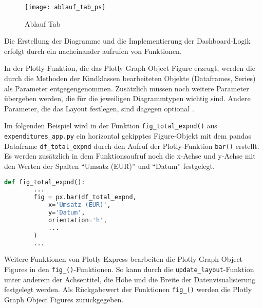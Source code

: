     \begin{figure}[H]
        \centering
            \texttt{[image: ablauf\_tab\_ps]}
            \caption{Ablauf Tab}
            \label{fig:process tab}
    \end{figure}

    Die Erstellung der Diagramme und die Implementierung der Dashboard-Logik erfolgt durch ein nacheinander aufrufen von Funktionen.




    In der Plotly-Funktion, die das Plotly Graph Object Figure erzeugt, werden die durch die Methoden der Kindklassen bearbeiteten Objekte (Dataframes, Series) 
    als Parameter entgegengenommen. Zusätzlich müssen noch weitere Parameter übergeben werden, die für die jeweiligen Diagrammtypen wichtig sind.
    Andere Parameter, die das Layout festlegen, sind dagegen optional \cite[vgl.][]{plotly_plotlygraph_objectsbar_2021}.
    
    Im folgenden Beispiel wird in der Funktion \texttt{fig\_total\_expnd()} aus \texttt{expenditures\_app.py} ein horizontal gekipptes Figure-Objekt
    mit dem pandas Dataframe \texttt{df\_total\_expnd} durch den Aufruf der Plotly-Funktion \texttt{bar()} erstellt. 
    Es werden zusätzlich in dem Funktionsaufruf noch die x-Achse und y-Achse mit den Werten der Spalten \enquote{Umsatz (EUR)} und \enquote{Datum} festgelegt. 

    \begin{lstlisting}[language=Python, caption=Funktion fig\_total\_expnd() Auszug 1]
    def fig_total_expnd():
        ...
        fig = px.bar(df_total_expnd,
            x='Umsatz (EUR)',
            y='Datum',
            orientation='h',
            ...
        )
        ...
    \end{lstlisting}
    
    Weitere Funktionen von Plotly Express bearbeiten die Plotly Graph Object Figures in den \texttt{fig\_()}-Funktionen. 
    So kann durch die \texttt{update\_layout}-Funktion unter anderem der Achsentitel, die Höhe und die Breite der Datenvisualisierung 
    festgelegt werden. Als Rückgabewert der Funktionen \texttt{fig\_()} werden die Plotly Graph Object Figures zurückgegeben.

